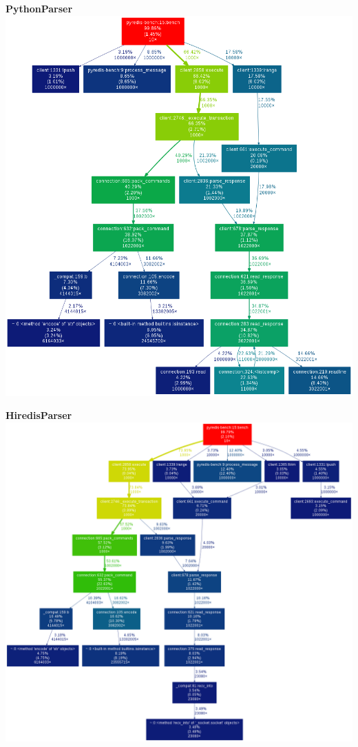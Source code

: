 \documentclass[a4paper, 11pt]{report}
\begin{document}
\begin{minipage}[t]{0.5\linewidth}
\textbf{PythonParser}\\

\includegraphics[width=0.9\linewidth]{pics/lrange-py.png}
\end{minipage}
\quad
\begin{minipage}[t]{0.5\linewidth}
\textbf{HiredisParser}\\

\includegraphics[width=0.9\linewidth]{pics/lrange-hi.png}
\end{minipage}
\end{document}
